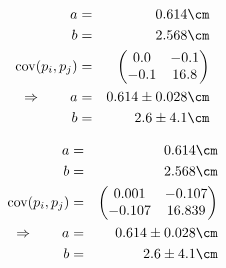 \begin{eqnarray}
    a &=& 0.614 \cm \nonumber \\
    b &=& 2.568 \cm \nonumber \\
    \mathrm{cov}(p_i, p_j) &=& 
    \begin{pmatrix}
        0.0 &-0.1 \\
        -0.1 &16.8 \\
    \end{pmatrix}
\\ \Rightarrow \qquad
    a &=& 0.614 \pm 0.028 \cm\\
    b &=& 2.6 \pm 4.1 \cm
\end{eqnarray}

\begin{eqnarray}
    a &=& 0.614 \cm \nonumber \\
    b &=& 2.568 \cm \nonumber \\
    \mathrm{cov}(p_i, p_j) &=& 
    \begin{pmatrix}
        0.001 &-0.107 \\
        -0.107 &16.839 \\
    \end{pmatrix}
\\ \Rightarrow \qquad
    a &=& 0.614 \pm 0.028 \cm\\
    b &=& 2.6 \pm 4.1 \cm
\end{eqnarray}

